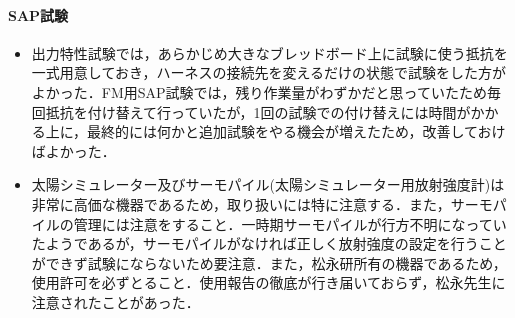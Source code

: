 \paragraph{SAP試験}
\begin{itemize}
	\item 出力特性試験では，あらかじめ大きなブレッドボード上に試験に使う抵抗を一式用意しておき，ハーネスの接続先を変えるだけの状態で試験をした方がよかった．FM用SAP試験では，残り作業量がわずかだと思っていたため毎回抵抗を付け替えて行っていたが，1回の試験での付け替えには時間がかかる上に，最終的には何かと追加試験をやる機会が増えたため，改善しておけばよかった．
	\item 太陽シミュレーター及びサーモパイル(太陽シミュレーター用放射強度計)は非常に高価な機器であるため，取り扱いには特に注意する．また，サーモパイルの管理には注意をすること．一時期サーモパイルが行方不明になっていたようであるが，サーモパイルがなければ正しく放射強度の設定を行うことができず試験にならないため要注意．また，松永研所有の機器であるため，使用許可を必ずとること．使用報告の徹底が行き届いておらず，松永先生に注意されたことがあった．
\end{itemize}
